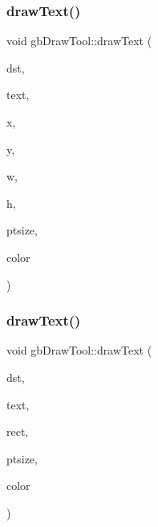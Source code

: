 \subsubsection{\texorpdfstring{drawText()}{drawText()}\hspace{0.1cm}{\footnotesize\ttfamily [1/2]}}
{\footnotesize\ttfamily void gb\+Draw\+Tool\+::draw\+Text (\begin{DoxyParamCaption}\item[{S\+D\+L\+\_\+\+Texture $\ast$}]{dst,  }\item[{string}]{text,  }\item[{int}]{x,  }\item[{int}]{y,  }\item[{int}]{w,  }\item[{int}]{h,  }\item[{int}]{ptsize,  }\item[{\mbox{\hyperlink{classgb_color}{gb\+Color}}}]{color }\end{DoxyParamCaption})}

\mbox{\label{classgb_draw_tool_ad3799e4d8fff8aab5d25b7cacefd001e}} 
\subsubsection{\texorpdfstring{drawText()}{drawText()}\hspace{0.1cm}{\footnotesize\ttfamily [2/2]}}
{\footnotesize\ttfamily void gb\+Draw\+Tool\+::draw\+Text (\begin{DoxyParamCaption}\item[{S\+D\+L\+\_\+\+Texture $\ast$}]{dst,  }\item[{string}]{text,  }\item[{\mbox{\hyperlink{classgb_rect}{gb\+Rect}}}]{rect,  }\item[{int}]{ptsize,  }\item[{\mbox{\hyperlink{classgb_color}{gb\+Color}}}]{color }\end{DoxyParamCaption})}

\mbox{\label{classgb_draw_tool_ac962b836d901020566bb601c895a61d6}} 
